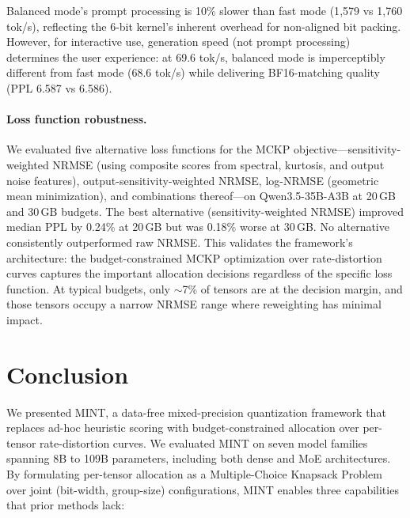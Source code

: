 \documentclass{article}
\begin{document}
Balanced mode's prompt processing is 10\% slower than fast mode (1{,}579 vs 1{,}760 tok/s), reflecting the 6-bit kernel's inherent overhead for non-aligned bit packing. However, for interactive use, generation speed (not prompt processing) determines the user experience: at 69.6 tok/s, balanced mode is imperceptibly different from fast mode (68.6 tok/s) while delivering BF16-matching quality (PPL 6.587 vs 6.586).

\paragraph{Loss function robustness.}
We evaluated five alternative loss functions for the MCKP objective---sensitivity-weighted NRMSE (using composite scores from spectral, kurtosis, and output noise features), output-sensitivity-weighted NRMSE, log-NRMSE (geometric mean minimization), and combinations thereof---on Qwen3.5-35B-A3B at 20\,GB and 30\,GB budgets. The best alternative (sensitivity-weighted NRMSE) improved median PPL by 0.24\% at 20\,GB but was 0.18\% worse at 30\,GB. No alternative consistently outperformed raw NRMSE. This validates the framework's architecture: the budget-constrained MCKP optimization over rate-distortion curves captures the important allocation decisions regardless of the specific loss function. At typical budgets, only ${\sim}$7\% of tensors are at the decision margin, and those tensors occupy a narrow NRMSE range where reweighting has minimal impact.

\section{Conclusion}
\label{sec:conclusion}

We presented MINT, a data-free mixed-precision quantization framework that replaces ad-hoc heuristic scoring with budget-constrained allocation over per-tensor rate-distortion curves. We evaluated MINT on seven model families spanning 8B to 109B parameters, including both dense and MoE architectures. By formulating per-tensor allocation as a Multiple-Choice Knapsack Problem over joint (bit-width, group-size) configurations, MINT enables three capabilities that prior methods lack:
\end{document}
